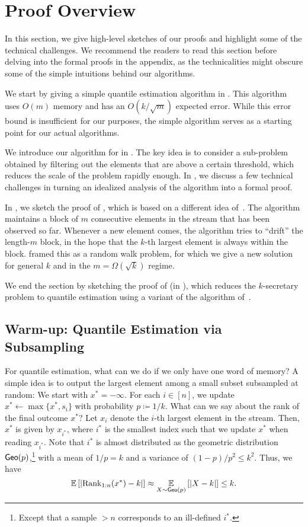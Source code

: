 \section{Proof Overview}
In this section, we give high-level sketches of our proofs and highlight some of the technical challenges. We recommend the readers to read this section before delving into the formal proofs in the appendix, as the technicalities might obscure some of the simple intuitions behind our algorithms.

We start by giving a simple quantile estimation algorithm in . This algorithm uses $O(m)$ memory and has an $O(k / \sqrt{m})$ expected error. While this error bound is insufficient for our purposes, the simple algorithm serves as a starting point for our actual algorithms.

We introduce our algorithm for  in . The key idea is to consider a sub-problem obtained by filtering out the elements that are above a certain threshold, which reduces the scale of the problem rapidly enough. In , we discuss a few technical challenges in turning an idealized analysis of the algorithm into a formal proof.

In , we sketch the proof of , which is based on a different idea of~\cite{MP80}. The algorithm maintains a block of $m$ consecutive elements in the stream that has been observed so far. Whenever a new element comes, the algorithm tries to ``drift'' the length-$m$ block, in the hope that the $k$-th largest element is always within the block. \cite{MP80} framed this as a random walk problem, for which we give a new solution for general $k$ and in the $m = \Omega(\sqrt{k})$ regime.

We end the section by sketching the proof of  (in ), which reduces the $k$-secretary problem to quantile estimation using a variant of the algorithm of~\cite{Kleinberg05}.

\subsection{Warm-up: Quantile Estimation via Subsampling}\label{sec:overview-warmup}
For quantile estimation, what can we do if we only have one word of memory? A simple idea is to output the largest element among a small subset subsampled at random: We start with $x^* = -\infty$. For each $i \in [n]$, we update $x^* \gets \max\{x^*, s_i\}$ with probability $p \coloneqq 1/k$. What can we say about the rank of the final outcome $x^*$? Let $x_i$ denote the $i$-th largest element in the stream. Then, $x^*$ is given by $x_{i^*}$, where $i^*$ is the smallest index such that we update $x^*$ when reading $x_{i^*}$. Note that $i^*$ is almost distributed as the geometric distribution $\mathsf{Geo}(p)$,\footnote{Except that a sample $> n$ corresponds to an ill-defined $i^*$.} with a mean of $1/p = k$ and a variance of $(1 - p)/p^2 \le k^2$. Thus, we have
\[
    \operatorname*{\mathbb{E}}_{}\left[|\mathrm{Rank}_{1:n}(x^*) - k|\right]
\approx \operatorname*{\mathbb{E}}_{X \sim \mathsf{Geo}(p)}\left[|X - k|\right]
\le k.
\]

